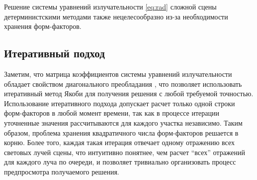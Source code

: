 \documentclass[12pt]{article}
\begin{document}
Решение системы уравнений излучательности \eqref{eq:rad} сложной сцены детерминистскими методами также нецелесообразно из-за необходимости хранения форм-факторов.
\subsection{Итеративный подход}
Заметим, что матрица коэффициентов системы уравнений излучательности обладает свойством диагонального преобладания \cite{Pet06}, что позволяет использовать итеративный метод Якоби для получения решения с любой требуемой точностью. Использование итеративного подхода допускает расчет только одной строки форм-факторов в любой момент времени, так как в процессе итерации уточненные значения рассчитываются для каждого участка независимо. Таким образом, проблема хранения квадратичного числа форм-факторов решается в корню. Более того, каждая такая итерация отвечает одному отражению всех световых лучей сцены, что интуитивно понятнее, чем расчет ``всех'' отражений для каждого луча по очереди, и позволяет тривиально организовать процесс предпросмотра получаемого решения.
\end{document}
